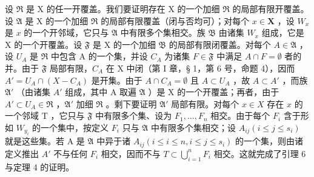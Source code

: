 设 \(\mathfrak{R}\) 是 X 的任一开覆盖。我们要证明存在 X 的一个加细 \(\mathfrak{R}\) 的局部有限开覆盖。设 \(\mathfrak{A}\) 是 X 的一个加细 \(\mathfrak{R}\) 的局部有限覆盖（闭与否均可）；对每个 \(x \in \mathbf{X}\) ，设 \(W_x\) 是 \(x\) 的一个开邻域，它只与 \(\mathfrak{A}\) 中有限多个集相交。族 \(\mathfrak{B}\) 由诸集 \(W_x\) 组成，它是 X 的一个开覆盖。设 \(\mathfrak{F}\) 是 X 的一个加细 \(\mathfrak{B}\) 的局部有限闭覆盖。对每个 \(A \in \mathfrak{A}\) ，设 \(U_A\) 是 \(\mathfrak{R}\) 中包含 A 的一个集，并设 \(C_A\) 为诸集 \(F \in \mathfrak{F}\) 中满足 \(A \cap F = \emptyset\) 者的并。由于 \(\mathfrak{F}\) 局部有限，\(C_A\) 在 X 中闭（第 I 章，§ 1，第 6 号，命题 4），因而 \(A' = U_A \cap (X - C_A)\) 是开集。由于 \(A \cap C_A = \emptyset\) 且 \(A \subset U_A\) ，故 \(A \subset A'\) ，而族 \(\mathfrak{A}'\) （由诸集 \(A'\) 组成，其中 A 取遍 \(\mathfrak{A}\) ）是 X 的一个开覆盖；再者，由于 \(A' \subset U_A \in \mathfrak{R}\) ，\(\mathfrak{A}'\) 加细 \(\mathfrak{R}\) 。剩下要证明 \(\mathfrak{A}'\) 局部有限。对每个 \(x \in X\) 存在 \(x\) 的一个邻域 T ，它只与 \(\mathfrak{F}\) 中有限多个集、设为 \(F_1, \ldots, F_n\) 相交。由于每个 \(F_i\) 含于形如 \(W_{y_i}\) 的一个集中，按定义 \(F_i\) 只与 \(\mathfrak{A}\) 中有限多个集相交；设 \(A_{ij} (i \leqslant j \leqslant s_i)\) 就是这些集。若 A 是 \(\mathfrak{A}\) 中异于诸 \(A_{ij} (i \leqslant i \leqslant n, i \leqslant j \leqslant s_i)\) 的一个集，则由诸定义推出 \(A'\) 不与任何 \(F_i\) 相交，因而不与 \(T \subset \bigcup_{i=1}^{n} F_i\) 相交。这就完成了引理 6 与定理 4 的证明。

